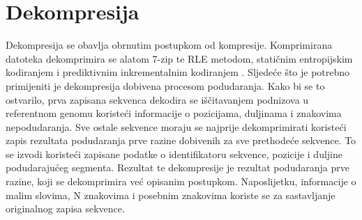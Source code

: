 \section{Dekompresija}
Dekompresija se obavlja obrnutim postupkom od kompresije. Komprimirana datoteka dekomprimira se alatom 7-zip te RLE metodom, statičnim entropijskim kodiranjem \cite{hrcm} i prediktivnim inkrementalnim kodiranjem \cite{hrcm}. Sljedeće što je potrebno primijeniti je dekompresija dobivena procesom podudaranja. Kako bi se to ostvarilo, prva zapisana sekvenca dekodira se iščitavanjem podnizova u referentnom genomu koristeći informacije o pozicijama, duljinama i znakovima nepodudaranja. Sve ostale sekvence moraju se najprije dekomprimirati koristeći zapis rezultata podudaranja prve razine dobivenih za sve prethodeće sekvence. To se izvodi koristeći zapisane podatke o identifikatoru sekvence, pozicije i duljine podudarajućeg segmenta. Rezultat te dekompresije je rezultat podudaranja prve razine, koji se dekomprimira već opisanim postupkom. Naposlijetku, informacije o malim slovima, N znakovima i posebnim znakovima koriste se za sastavljanje originalnog zapisa sekvence.

